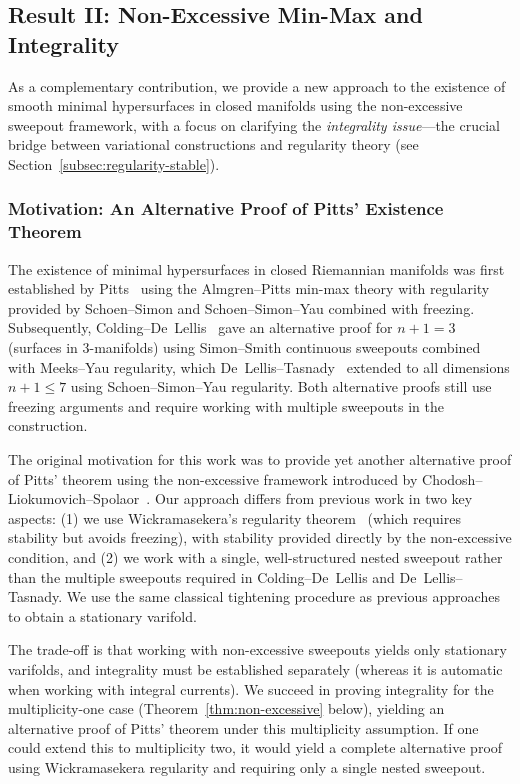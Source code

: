 \subsection{Result II: Non-Excessive Min-Max and Integrality}

As a complementary contribution, we provide a new approach to the existence of smooth minimal
hypersurfaces in closed manifolds using the non-excessive sweepout framework, with a focus on
clarifying the \emph{integrality issue}---the crucial bridge between variational constructions and
regularity theory (see Section~\ref{subsec:regularity-stable}).

\subsubsection{Motivation: An Alternative Proof of Pitts' Existence Theorem}

The existence of minimal hypersurfaces in closed Riemannian manifolds was first established by
Pitts~\cite{Pit81} using the Almgren--Pitts min-max theory with regularity provided by
Schoen--Simon and Schoen--Simon--Yau combined with freezing. Subsequently,
Colding--De~Lellis~\cite{CL03} gave an alternative proof for $n+1=3$ (surfaces in 3-manifolds) using
Simon--Smith continuous sweepouts combined with Meeks--Yau regularity, which De~Lellis--Tasnady~\cite{DLT13}
extended to all dimensions $n+1 \leq 7$ using Schoen--Simon--Yau regularity. Both alternative proofs
still use freezing arguments and require working with multiple sweepouts in the construction.

The original motivation for this work was to provide yet another alternative proof of Pitts' theorem
using the non-excessive framework introduced by Chodosh--Liokumovich--Spolaor~\cite{CLS22}. Our
approach differs from previous work in two key aspects: (1) we use Wickramasekera's regularity
theorem~\cite{Wic14} (which requires stability but avoids freezing), with stability provided
directly by the non-excessive condition, and (2) we work with a single, well-structured nested
sweepout rather than the multiple sweepouts required in Colding--De~Lellis and De~Lellis--Tasnady.
We use the same classical tightening procedure as previous approaches to obtain a stationary varifold.

The trade-off is that working with non-excessive sweepouts yields only stationary varifolds, and
integrality must be established separately (whereas it is automatic when working with integral
currents). We succeed in proving integrality for the multiplicity-one case
(Theorem~\ref{thm:non-excessive} below), yielding an alternative proof of Pitts' theorem under this
multiplicity assumption. If one could extend this to multiplicity two, it would yield a complete
alternative proof using Wickramasekera regularity and requiring only a single nested sweepout.

